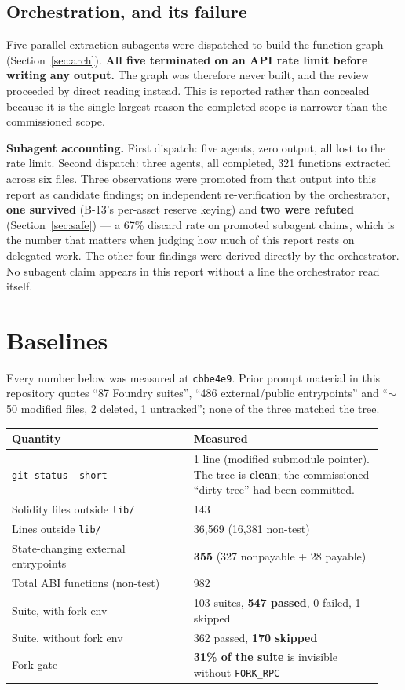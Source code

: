 \documentclass[11pt,a4paper]{article}
\newcommand{\code}[1]{\texttt{\small #1}}
\begin{document}
\subsection{Orchestration, and its failure}

Five parallel extraction subagents were dispatched to build the function graph
(Section~\ref{sec:arch}). \textbf{All five terminated on an API rate limit before writing
any output.} The graph was therefore never built, and the review proceeded by direct
reading instead. This is reported rather than concealed because it is the single largest
reason the completed scope is narrower than the commissioned scope.

\textbf{Subagent accounting.} First dispatch: five agents, zero output, all lost to the
rate limit. Second dispatch: three agents, all completed, 321 functions extracted across
six files. Three observations were promoted from that output into this report as candidate
findings; on independent re-verification by the orchestrator, \textbf{one survived}
(B-13's per-asset reserve keying) and \textbf{two were refuted}
(Section~\ref{sec:safe}) --- a 67\% discard rate on promoted subagent claims, which is
the number that matters when judging how much of this report rests on delegated work. The
other four findings were derived directly by the orchestrator. No subagent claim appears
in this report without a line the orchestrator read itself.

\section{Baselines}

Every number below was measured at \code{cbbe4e9}. Prior prompt material in this
repository quotes ``87 Foundry suites'', ``486 external/public entrypoints'' and ``$\sim$50
modified files, 2 deleted, 1 untracked''; none of the three matched the tree.

\begin{longtable}{@{}p{0.46\linewidth}p{0.48\linewidth}@{}}
\toprule
\textbf{Quantity} & \textbf{Measured} \\
\midrule
\endhead
\code{git status --short} & 1 line (modified submodule pointer). The tree is
  \textbf{clean}; the commissioned ``dirty tree'' had been committed. \\
Solidity files outside \code{lib/} & 143 \\
Lines outside \code{lib/} & 36{,}569 (16{,}381 non-test) \\
State-changing external entrypoints & \textbf{355} (327 nonpayable + 28 payable) \\
Total ABI functions (non-test) & 982 \\
Suite, with fork env & 103 suites, \textbf{547 passed}, 0 failed, 1 skipped \\
Suite, without fork env & 362 passed, \textbf{170 skipped} \\
Fork gate & \textbf{31\% of the suite} is invisible without \code{FORK\_RPC} \\
\bottomrule
\end{longtable}
\end{document}
